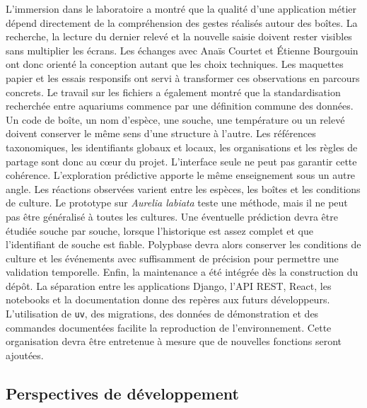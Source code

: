 \documentclass{article}
\begin{document}
L’immersion dans le laboratoire a montré que la qualité d’une application métier dépend directement de la compréhension des gestes réalisés autour des boîtes. La recherche, la lecture du dernier relevé et la nouvelle saisie doivent rester visibles sans multiplier les écrans. Les échanges avec Anaïs Courtet et Étienne Bourgouin ont donc orienté la conception autant que les choix techniques. Les maquettes papier et les essais responsifs ont servi à transformer ces observations en parcours concrets.
Le travail sur les fichiers a également montré que la standardisation recherchée entre aquariums commence par une définition commune des données. Un code de boîte, un nom d’espèce, une souche, une température ou un relevé doivent conserver le même sens d’une structure à l’autre. Les références taxonomiques, les identifiants globaux et locaux, les organisations et les règles de partage sont donc au cœur du projet. L’interface seule ne peut pas garantir cette cohérence.
L’exploration prédictive apporte le même enseignement sous un autre angle. Les réactions observées varient entre les espèces, les boîtes et les conditions de culture. Le prototype sur \textit{Aurelia labiata} teste une méthode, mais il ne peut pas être généralisé à toutes les cultures. Une éventuelle prédiction devra être étudiée souche par souche, lorsque l’historique est assez complet et que l’identifiant de souche est fiable. Polypbase devra alors conserver les conditions de culture et les événements avec suffisamment de précision pour permettre une validation temporelle.
Enfin, la maintenance a été intégrée dès la construction du dépôt. La séparation entre les applications Django, l’API REST, React, les notebooks et la documentation donne des repères aux futurs développeurs. L’utilisation de \texttt{uv}, des migrations, des données de démonstration et des commandes documentées facilite la reproduction de l’environnement. Cette organisation devra être entretenue à mesure que de nouvelles fonctions seront ajoutées.

\subsection{Perspectives de développement}
\end{document}
